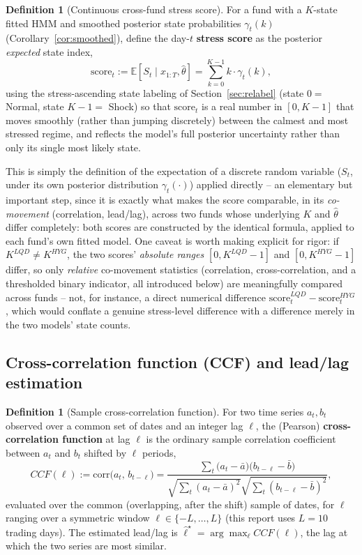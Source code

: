 \documentclass[11pt]{article}
\theoremstyle{definition}
\newtheorem{definition}[theorem]{Definition}
\theoremstyle{remark}
\begin{document}
\begin{definition}[Continuous cross-fund stress score]
For a fund with a $K$-state fitted HMM and smoothed posterior state probabilities $\gamma_t(k)$ (Corollary~\ref{cor:smoothed}), define the day-$t$ \textbf{stress score} as the posterior \emph{expected} state index,
\[
\mathrm{score}_t := \mathbb{E}[S_t\mid x_{1:T},\widehat\theta] = \sum_{k=0}^{K-1} k\cdot\gamma_t(k),
\]
using the stress-ascending state labeling of Section~\ref{sec:relabel} (state $0=$ Normal, state $K-1=$ Shock) so that $\mathrm{score}_t$ is a real number in $[0,K-1]$ that moves smoothly (rather than jumping discretely) between the calmest and most stressed regime, and reflects the model's full posterior uncertainty rather than only its single most likely state.
\end{definition}
This is simply the definition of the expectation of a discrete random variable ($S_t$, under its own posterior distribution $\gamma_t(\cdot)$) applied directly -- an elementary but important step, since it is exactly what makes the score comparable, in its \emph{co-movement} (correlation, lead/lag), across two funds whose underlying $K$ and $\widehat\theta$ differ completely: both scores are constructed by the identical formula, applied to each fund's own fitted model. One caveat is worth making explicit for rigor: if $K^{LQD}\ne K^{HYG}$, the two scores' \emph{absolute ranges} $[0,K^{LQD}-1]$ and $[0,K^{HYG}-1]$ differ, so only \emph{relative} co-movement statistics (correlation, cross-correlation, and a thresholded binary indicator, all introduced below) are meaningfully compared across funds -- not, for instance, a direct numerical difference $\mathrm{score}_t^{LQD}-\mathrm{score}_t^{HYG}$, which would conflate a genuine stress-level difference with a difference merely in the two models' state counts.

\subsection{Cross-correlation function (CCF) and lead/lag estimation}
\label{sec:ccf}

\begin{definition}[Sample cross-correlation function]
For two time series $a_t,b_t$ observed over a common set of dates and an integer lag $\ell$, the (Pearson) \textbf{cross-correlation function} \cite{boxjenkins} at lag $\ell$ is the ordinary sample correlation coefficient between $a_t$ and $b_t$ shifted by $\ell$ periods,
\[
CCF(\ell) := \mathrm{corr}\big(a_t,\,b_{t-\ell}\big) = \frac{\sum_t\big(a_t-\bar a\big)\big(b_{t-\ell}-\bar b\big)}{\sqrt{\sum_t(a_t-\bar a)^2}\sqrt{\sum_t(b_{t-\ell}-\bar b)^2}},
\]
evaluated over the common (overlapping, after the shift) sample of dates, for $\ell$ ranging over a symmetric window $\ell\in\{-L,\dots,L\}$ (this report uses $L=10$ trading days). The estimated lead/lag is $\widehat\ell^\star=\arg\max_\ell CCF(\ell)$, the lag at which the two series are most similar.
\end{definition}
\end{document}
